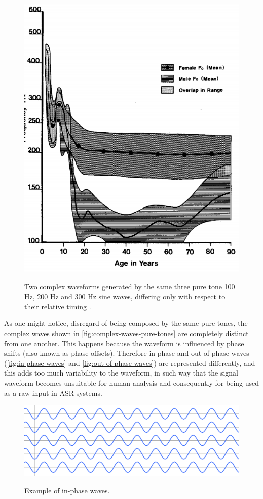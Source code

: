 \begin{figure}[!ht]
        \myfloatalign
        {\includegraphics[width=.66\linewidth]{gfx/f0-age-sex.png}}
        \caption{Two complex waveforms generated by the same three pure tone 100 Hz, 200 Hz and 300 Hz sine waves, differing only 
        with respect to their relative timing \cite{Ladefoged1996}.}
        \label{fig:complex-waves-pure-tones}
\end{figure}
 
As one might notice, disregard of being composed by the same pure tones, the complex waves shown in 
\autoref{fig:complex-waves-pure-tones} are completely distinct from one another. This happens because the waveform is influenced
by phase shifts (also known as phase offsets). Therefore in-phase and out-of-phase waves (\autoref{fig:in-phase-waves} and
\autoref{fig:out-of-phase-waves}) are represented differently, and this adds too much variability to the waveform, in such way that
the signal waveform becomes unsuitable for human analysis and consequently for being used as a raw input in \ac{ASR} systems. 


\begin{figure}[!ht]
        \myfloatalign
        {\includegraphics[width=.66\linewidth]{gfx/in-phase-waves.png}}
        \caption{Example of in-phase waves.}
        \label{fig:in-phase-waves}
\end{figure}

